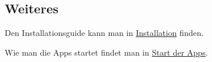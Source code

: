 \subsection*{Weiteres }

Den Installationsguide kann man in \hyperlink{page1}{Installation} finden.

Wie man die Apps startet findet man in \hyperlink{page2}{Start der Apps}. 